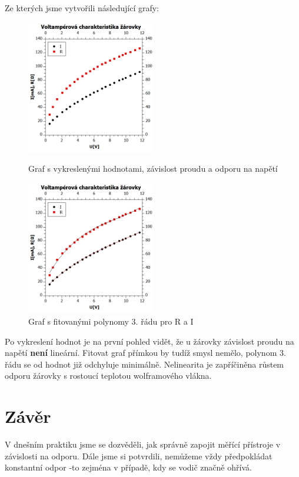 \documentclass[czech,11pt,a4paper]{article}
\begin{document}
	Ze kterých jsme vytvořili následující grafy:
	
	\begin{figure}[H]
		\begin{center}
			\includegraphics[width=0.5\textwidth]{VA_zarovka}
		\caption{Graf s vykreslenými hodnotami, závislost proudu a odporu na napětí}
		\includegraphics[width=0.5\textwidth]{Va_zarovka2}
		
		\caption{Graf s fitovanými polynomy 3. řádu pro R a I}
		\end{center}
	\end{figure}
	
	Po vykreslení hodnot je na první pohled vidět, že u žárovky závislost proudu na napětí \textbf{není} lineární. Fitovat graf přímkou by tudíž smysl nemělo, polynom 3. řádu se od hodnot již odchyluje minimálně. Nelinearita je zapříčiněna růstem odporu žárovky s rostoucí teplotou wolframového vlákna.
	

	
	
	
	
	\section{Závěr}
V dnešním praktiku jsme se dozvěděli, jak správně zapojit měřící přístroje v závislosti na odporu. \textit{}Dále jsme si potvrdili, nemůžeme vždy předpokládat konstantní odpor -to zejména v případě, kdy se vodič značně ohřívá.
	
	
	
\end{document}
